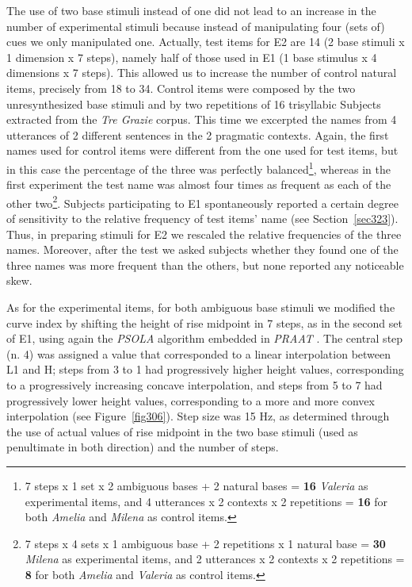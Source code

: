 The use of two base stimuli instead of one did not lead to an increase in the number of experimental stimuli because instead of manipulating four (sets of) cues we only manipulated one. Actually, test items for E2 are 14 (2 base stimuli x 1 dimension x 7 steps), namely half of those used in E1 (1 base stimulus x 4 dimensions x 7 steps). This allowed us to increase the number of control natural items, precisely from 18 to 34. Control items were composed by the two unresynthesized base stimuli and by two repetitions of 16 trisyllabic Subjects extracted from the \textit{Tre Grazie} corpus. This time we excerpted the names from 4 utterances of 2 different sentences in the 2 pragmatic contexts. Again, the first names used for control items were different from the one used for test items, but in this case the percentage of the three was perfectly balanced\footnote{7 steps x 1 set x 2 ambiguous bases + 2 natural bases = \textbf{16} \textit{Valeria} as experimental items, and 4 utterances x 2 contexts x 2 repetitions = \textbf{16} for both \textit{Amelia} and \textit{Milena} as control items.}, whereas in the first experiment the test name was almost four times as frequent as each of the other two\footnote{7 steps x 4 sets x 1 ambiguous base + 2 repetitions x 1 natural base = \textbf{30} \textit{Milena} as experimental items, and 2 utterances x 2 contexts x 2 repetitions = \textbf{8} for both \textit{Amelia} and \textit{Valeria} as control items.}. Subjects participating to E1 spontaneously reported a certain degree of sensitivity to the relative frequency of test items' name (see Section~\ref{sec323}). Thus, in preparing stimuli for E2 we rescaled the relative frequencies of the three names. Moreover, after the test we asked subjects whether they found one of the three names was more frequent than the others, but none reported any noticeable skew.

As for the experimental items, for both ambiguous base stimuli we modified the curve index by shifting the height of rise midpoint in 7 steps, as in the second set of E1, using again the \textit{PSOLA} algorithm \citep{moulines1990pitchsyncronous} embedded in \textit{PRAAT} \citep{boersma2008praat}. The central step (n. 4) was assigned a value that corresponded to a linear interpolation between L1 and H; steps from 3 to 1 had progressively higher height values, corresponding to a progressively increasing concave interpolation, and steps from 5 to 7 had progressively lower height values, corresponding to a more and more convex interpolation (see Figure~\ref{fig306}). Step size was 15 Hz, as determined through the use of actual values of rise midpoint in the two base stimuli (used as penultimate in both direction) and the number of steps.

